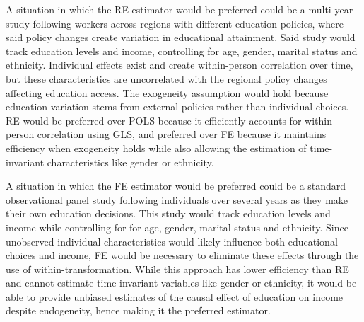 A situation in which the RE estimator would be preferred could be a multi-year study following workers across regions with different education policies, where said policy changes create variation in educational attainment. Said study would track education levels and income, controlling for age, gender, marital status and ethnicity. Individual effects exist and create within-person correlation over time, but these characteristics are uncorrelated with the regional policy changes affecting education access. The exogeneity assumption would hold because education variation stems from external policies rather than individual choices. RE would be preferred over POLS because it efficiently accounts for within-person correlation using GLS, and preferred over FE because it maintains efficiency when exogeneity holds while also allowing the estimation of time-invariant characteristics like gender or ethnicity.

A situation in which the FE estimator would be preferred could be a standard observational panel study following individuals over several years as they make their own education decisions. This study would track education levels and income while controlling for for age, gender, marital status and ethnicity. Since unobserved individual characteristics would likely influence both educational choices and income, FE would be necessary to eliminate these effects through the use of within-transformation. While this approach has lower efficiency than RE and cannot estimate time-invariant variables like gender or ethnicity, it would be able to provide unbiased estimates of the causal effect of education on income despite endogeneity, hence making it the preferred estimator.